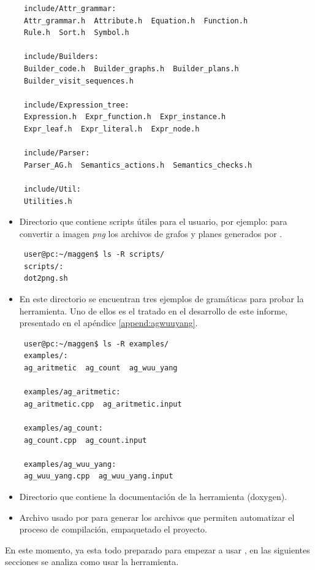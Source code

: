 \begin{itemize}
{\begin{verbatim}
 include/Attr_grammar:
 Attr_grammar.h  Attribute.h  Equation.h  Function.h  
 Rule.h  Sort.h  Symbol.h

 include/Builders:
 Builder_code.h  Builder_graphs.h  Builder_plans.h  
 Builder_visit_sequences.h

 include/Expression_tree:
 Expression.h  Expr_function.h  Expr_instance.h  
 Expr_leaf.h  Expr_literal.h  Expr_node.h

 include/Parser:
 Parser_AG.h  Semantics_actions.h  Semantics_checks.h

 include/Util:
 Utilities.h
\end{verbatim}}

\item {} Directorio que contiene scripts útiles para el usuario, por ejemplo:  para convertir a imagen \textit{png} los archivos de grafos y planes generados por \maggen.
{\footnotesize \begin{verbatim}
 user@pc:~/maggen$ ls -R scripts/
 scripts/:
 dot2png.sh
\end{verbatim} }
 
\item {} En este directorio se encuentran tres ejemplos de gramáticas para probar la herramienta. Uno de ellos es el tratado en el desarrollo de este informe, presentado en el apéndice \ref{append:agwuuyang}. 
{\footnotesize \begin{verbatim}
 user@pc:~/maggen$ ls -R examples/
 examples/:
 ag_aritmetic  ag_count  ag_wuu_yang

 examples/ag_aritmetic:
 ag_aritmetic.cpp  ag_aritmetic.input

 examples/ag_count:
 ag_count.cpp  ag_count.input

 examples/ag_wuu_yang:
 ag_wuu_yang.cpp  ag_wuu_yang.input
\end{verbatim} }

\item {} Directorio que contiene la documentación de la herramienta (doxygen).

\item Archivo  usado por  para generar los archivos  que permiten automatizar el proceso de compilación, empaquetado el proyecto.
\end{itemize}

En este momento, ya esta todo preparado para empezar a usar \maggen, en las siguientes secciones se analiza como usar la herramienta.

